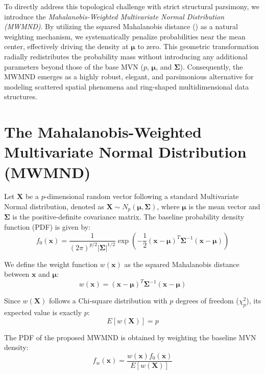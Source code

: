 \documentclass[twoside]{article}
\begin{document}
To directly address this topological challenge with strict structural parsimony, we introduce the \textit{Mahalanobis-Weighted Multivariate Normal Distribution (MWMND)}. By utilizing the squared Mahalanobis distance (\cite{mahalanobis1936}) as a natural weighting mechanism, we systematically penalize probabilities near the mean center, effectively driving the density at $\boldsymbol{\mu}$ to zero. This geometric transformation radially redistributes the probability mass without introducing any additional parameters beyond those of the base MVN ($p$, $\boldsymbol{\mu}$, and $\boldsymbol{\Sigma}$). Consequently, the MWMND emerges as a highly robust, elegant, and parsimonious alternative for modeling scattered spatial phenomena and ring-shaped multidimensional data structures.

\section{The Mahalanobis-Weighted Multivariate Normal Distribution (MWMND)}

Let $\mathbf{X}$ be a $p$-dimensional random vector following a standard Multivariate Normal distribution, denoted as $\mathbf{X} \sim N_p(\boldsymbol{\mu}, \boldsymbol{\Sigma})$, where $\boldsymbol{\mu}$ is the mean vector and $\boldsymbol{\Sigma}$ is the positive-definite covariance matrix. The baseline probability density function (PDF) is given by:
\begin{equation}
	f_0(\mathbf{x}) = \frac{1}{(2\pi)^{p/2} |\boldsymbol{\Sigma}|^{1/2}} \exp\left(-\frac{1}{2} (\mathbf{x} - \boldsymbol{\mu})^T \boldsymbol{\Sigma}^{-1} (\mathbf{x} - \boldsymbol{\mu})\right)
\end{equation}

We define the weight function $w(\mathbf{x})$ as the squared Mahalanobis distance between $\mathbf{x}$ and $\boldsymbol{\mu}$:
\begin{equation}
	w(\mathbf{x}) = (\mathbf{x} - \boldsymbol{\mu})^T \boldsymbol{\Sigma}^{-1} (\mathbf{x} - \boldsymbol{\mu})
\end{equation}

Since $w(\mathbf{X})$ follows a Chi-square distribution with $p$ degrees of freedom ($\chi^2_p$), its expected value is exactly $p$:
\begin{equation}
	E[w(\mathbf{X})] = p
\end{equation}

The PDF of the proposed MWMND is obtained by weighting the baseline MVN density:
\begin{equation}
	f_w(\mathbf{x}) = \frac{w(\mathbf{x}) f_0(\mathbf{x})}{E[w(\mathbf{X})]}
\end{equation}
\end{document}
